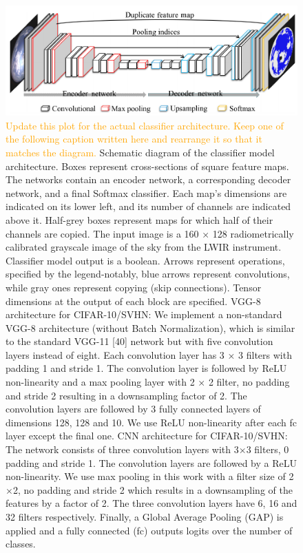\documentclass[amt, article]{copernicus}
\begin{document}
\begin{figure}[t]
	\includegraphics[width=\hsize]{figures/schematics_segmentation_model.png}
	\caption{\textcolor{orange}{Update this plot for the actual classifier architecture. Keep one of the following caption written here and rearrange it so that it matches the diagram.}
		Schematic diagram of the classifier model architecture. Boxes represent cross-sections of square feature maps.  The networks contain an encoder network, a corresponding decoder network, and a final Softmax classifier. Each map's dimensions are indicated on its lower left, and its number of channels are indicated above it. Half-grey boxes represent maps for which half of their channels are copied. The input image is a 160 × 128 radiometrically calibrated grayscale image of the sky from the LWIR instrument. Classifier model output is a boolean. Arrows represent operations, specified by the legend-notably, blue arrows represent convolutions, while gray ones represent copying (skip connections). Tensor dimensions at the output of each block are specified.
        VGG-8 architecture for CIFAR-10/SVHN: We implement a non-standard VGG-8 architecture (without Batch Normalization), which is similar to the standard VGG-11 [40] network but with five convolution layers instead of eight. Each convolution layer has 3 × 3 filters with padding 1 and stride 1. The convolution layer is followed by ReLU non-linearity and a max pooling layer with 2 × 2 filter, no padding and stride 2 resulting in a downsampling factor of 2. The convolution layers are followed by 3 fully connected layers of dimensions 128, 128 and 10. We use ReLU non-linearity after each fc layer except the final one.
        CNN architecture for CIFAR-10/SVHN: The network consists of three convolution layers with 3$\times$3 filters, 0 padding and stride 1. The convolution layers are followed by a ReLU non-linearity. We use max pooling in this work with a filter size of 2$\times$2, no padding and stride 2 which results in a downsampling of the features by a factor of 2. The three convolution layers have 6, 16 and 32 filters respectively. Finally, a Global Average Pooling (GAP) is applied and a fully connected (fc) outputs logits over the number of classes.}
        \label{fig:schematics_classification_model}
\end{figure}
\end{document}
